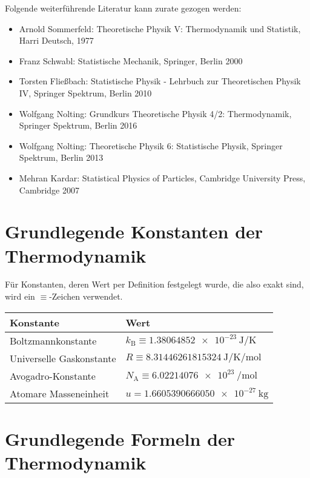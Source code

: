 Folgende weiterführende Literatur kann zurate gezogen werden:
\begin{itemize}
	\item Arnold Sommerfeld: Theoretische Physik V: Thermodynamik und Statistik, Harri Deutsch, 1977
	\item Franz Schwabl: Statistische Mechanik, Springer, Berlin 2000
	\item Torsten Fließbach: Statistische Physik - Lehrbuch zur Theoretischen Physik IV, Springer Spektrum, Berlin 2010
	\item Wolfgang Nolting: Grundkurs Theoretische Physik 4/2: Thermodynamik, Springer Spektrum, Berlin 2016
	\item Wolfgang Nolting: Theoretische Physik 6: Statistische Physik, Springer Spektrum, Berlin 2013
	\item Mehran Kardar: Statistical Physics of Particles, Cambridge University Press, Cambridge 2007
\end{itemize}



\section{Grundlegende Konstanten der Thermodynamik}

Für Konstanten, deren Wert per Definition festgelegt wurde, die also exakt sind, wird ein $\equiv $-Zeichen verwendet.


\begin{table}[H]
	\centering
	\begin{tabular}{|l|l|} \hline
		\textbf{Konstante}       & \textbf{Wert}                                                                            \\
		\hline

		Boltzmannkonstante       & \centering\arraybackslash{} $k_\mathrm{B} \equiv \SI{1,38064852e-23}{\joule\per\kelvin}$ \\
		Universelle Gaskonstante & \centering\arraybackslash{} $R \equiv \SI{8,31446261815324}{\joule\per\kelvin\per\mole}$ \\
		Avogadro-Konstante        & \centering\arraybackslash{} $N_\mathrm{A} \equiv \SI{6,02214076e23}{\per\mole}$          \\
		Atomare Masseneinheit    & \centering\arraybackslash{} $u= \SI{1,6605390666050e-27}{\kg}$                           \\
		\hline
	\end{tabular}
\end{table}




\section{Grundlegende Formeln der Thermodynamik}
